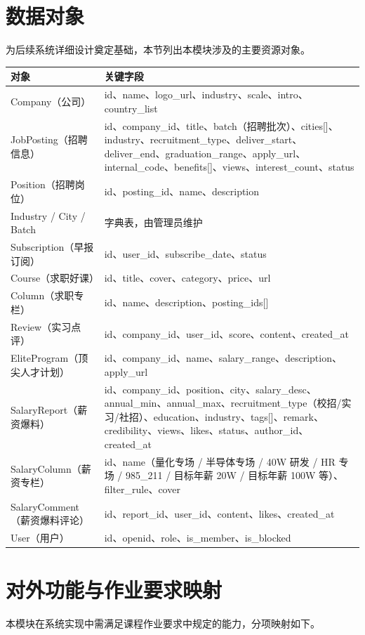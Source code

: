 \documentclass[12pt,a4paper]{ctexart}
\begin{document}
\section{数据对象}
为后续系统详细设计奠定基础，本节列出本模块涉及的主要资源对象。
\begin{longtable}{p{3.2cm}p{11cm}}
\toprule
\textbf{对象} & \textbf{关键字段}\\
\midrule
\endhead
Company（公司） & id、name、logo\_url、industry、scale、intro、country\_list\\
JobPosting（招聘信息） & id、company\_id、title、batch（招聘批次）、cities[]、industry、recruitment\_type、deliver\_start、deliver\_end、graduation\_range、apply\_url、internal\_code、benefits[]、views、interest\_count、status\\
Position（招聘岗位） & id、posting\_id、name、description\\
Industry / City / Batch & 字典表，由管理员维护\\
Subscription（早报订阅） & id、user\_id、subscribe\_date、status\\
Course（求职好课） & id、title、cover、category、price、url\\
Column（求职专栏） & id、name、description、posting\_ids[]\\
Review（实习点评） & id、company\_id、user\_id、score、content、created\_at\\
EliteProgram（顶尖人才计划） & id、company\_id、name、salary\_range、description、apply\_url\\
SalaryReport（薪资爆料） & id、company\_id、position、city、salary\_desc、annual\_min、annual\_max、recruitment\_type（校招/实习/社招）、education、industry、tags[]、remark、credibility、views、likes、status、author\_id、created\_at\\
SalaryColumn（薪资专栏） & id、name（量化专场 / 半导体专场 / 40W 研发 / HR 专场 / 985\_211 / 目标年薪 20W / 目标年薪 100W 等）、filter\_rule、cover\\
SalaryComment（薪资爆料评论） & id、report\_id、user\_id、content、likes、created\_at\\
User（用户） & id、openid、role、is\_member、is\_blocked\\
\bottomrule
\end{longtable}

\section{对外功能与作业要求映射}
本模块在系统实现中需满足课程作业要求中规定的能力，分项映射如下。
\end{document}
